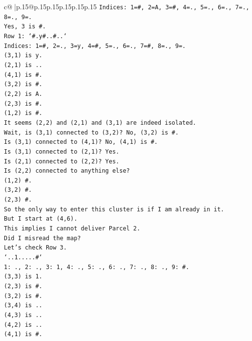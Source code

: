 \documentclass{article}
\begin{document}
{\begin{supertabular}{c@{$\;$}|p{.15\linewidth}@{}p{.15\linewidth}p{.15\linewidth}p{.15\linewidth}p{.15\linewidth}p{.15\linewidth}}
{{{\texttt{Indices: 1=\#, 2=A, 3=\#, 4=., 5=., 6=., 7=., 8=., 9=.} \\
\texttt{Yes, 3 is \#.} \\
\texttt{Row 1: `\#.y\#..\#..`} \\
\texttt{Indices: 1=\#, 2=., 3=y, 4=\#, 5=., 6=., 7=\#, 8=., 9=.} \\
\texttt{(3,1) is y.} \\
\texttt{(2,1) is ..} \\
\texttt{(4,1) is \#.} \\
\texttt{(3,2) is \#.} \\
\texttt{(2,2) is A.} \\
\texttt{(2,3) is \#.} \\
\texttt{(1,2) is \#.} \\
\texttt{It seems (2,2) and (2,1) and (3,1) are indeed isolated.} \\
\texttt{Wait, is (3,1) connected to (3,2)? No, (3,2) is \#.} \\
\texttt{Is (3,1) connected to (4,1)? No, (4,1) is \#.} \\
\texttt{Is (3,1) connected to (2,1)? Yes.} \\
\texttt{Is (2,1) connected to (2,2)? Yes.} \\
\texttt{Is (2,2) connected to anything else?} \\
\texttt{(1,2) \#.} \\
\texttt{(3,2) \#.} \\
\texttt{(2,3) \#.} \\
\texttt{So the only way to enter this cluster is if I am already in it.} \\
\texttt{But I start at (4,6).} \\
\texttt{This implies I cannot deliver Parcel 2.} \\
\texttt{Did I misread the map?} \\
\texttt{Let's check Row 3.} \\
\texttt{`..1.....\#`} \\
\texttt{1: ., 2: ., 3: 1, 4: ., 5: ., 6: ., 7: ., 8: ., 9: \#.} \\
\texttt{(3,3) is 1.} \\
\texttt{(2,3) is \#.} \\
\texttt{(3,2) is \#.} \\
\texttt{(3,4) is ..} \\
\texttt{(4,3) is ..} \\
\texttt{(4,2) is ..} \\
\texttt{(4,1) is \#.} \\
}}}
\end{supertabular}}
\end{document}
